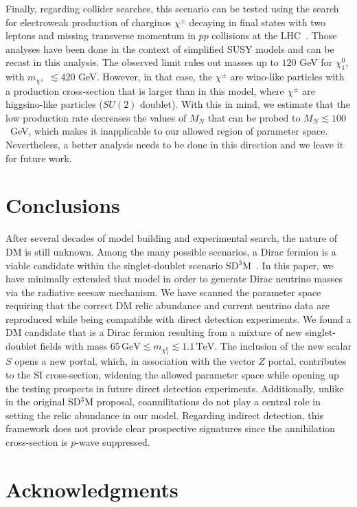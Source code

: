 \documentclass[12pt,letterpaper]{article}
\begin{document}
Finally, regarding collider searches, this scenario can be tested using the search for electroweak production of charginos $\chi^{\pm}$ decaying in final states with two leptons and missing transverse momentum in $pp$ collisions at the LHC~\cite{ATLAS:2019cfv}. 
Those analyses have been done in the context of simplified SUSY models and can be recast in this analysis. 
The observed limit rules out masses up to $120$ GeV for $\chi_1^0$, with  $m_{\chi^{\pm}}$ $\lesssim 420$ GeV. 
However, in that case, the $\chi^{\pm}$ are wino-like particles with a production cross-section that is larger than in this model, where $\chi^{\pm}$ are higgsino-like particles ($SU(2)$ doublet). With this in mind, we estimate that the low production rate decreases the values of $M_N$ that can be probed to $M_N \lesssim 100$~GeV, which makes it inapplicable to our allowed region of parameter space. Nevertheless, a better analysis needs to be done in this direction and we leave it for future work.


\section{Conclusions}

After several decades of model building and experimental search, the nature of DM is still unknown. Among the many possible scenarios, a Dirac fermion is a viable candidate within the singlet-doublet scenario SD${}^3$M~\cite{Yaguna:2015mva}. 
In this paper, we have minimally extended that model in order to generate Dirac neutrino masses via the radiative seesaw mechanism. 
We have scanned the parameter space requiring that the correct DM relic abundance and current neutrino data are reproduced while being compatible with direct detection experiments. 
We found a DM candidate that is a Dirac fermion resulting from a mixture of new singlet-doublet fields with mass  $65\,\text{GeV}\lesssim m_{\chi_1^0}\lesssim 1.1\,\text{TeV}$.
The inclusion of the new scalar $S$ opens a new portal, which, in association with the vector $Z$ portal, contributes to the $\text{SI}$ cross-section, widening the allowed parameter space while opening up the testing prospects in future direct detection experiments. 
Additionally, unlike in the original SD${}^3$M proposal, coannilitations do not play a central role in setting the relic abundance in our model.
Regarding indirect detection, this framework does not provide clear prospective signatures since the annihilation cross-section is $p$-wave suppressed.

\section{Acknowledgments}
\end{document}

